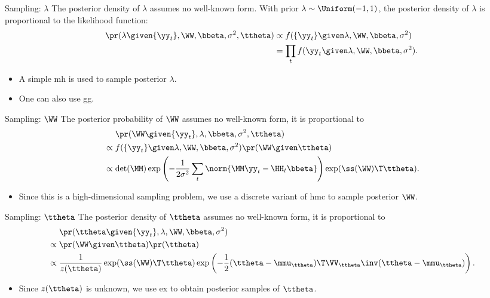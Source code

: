 \documentclass{beamer}
\begin{document}
\begin{frame}{Sampling: $\lambda$}
	The posterior density of $\lambda$ assumes no well-known form.
	With prior $\lambda\sim\Uniform(-1,1)$,
	the posterior density of $\lambda$ is proportional to the likelihood function:
	\begin{align*}
		\pr(\lambda\given\{\yy_{t}\},\WW,\bbeta,\sigma^2,\ttheta)
		&\propto f(\{\yy_{t}\}\given\lambda,\WW,\bbeta,\sigma^{2}) \\
		&= \prod_{t} f(\yy_{t}\given\lambda,\WW,\bbeta,\sigma^{2}).
	\end{align*}
	\begin{itemize}
		\item
			A simple \acrlong{mh} is used to sample posterior $\lambda$.
		\item
			One can also use \acrlong{gg}.
	\end{itemize}
\end{frame}

\begin{frame}{Sampling: $\WW$}
	The posterior probability of $\WW$ assumes no well-known form,
	it is proportional to
	\begin{align*}
		&\mathrel{\phantom{\propto}} \pr(\WW\given\{\yy_{t}\},\lambda,\bbeta,\sigma^{2},\ttheta) \\
		&\propto f(\{\yy_{t}\}\given\lambda,\WW,\bbeta,\sigma^{2}) \pr(\WW\given\ttheta) \\
		&\propto
		\det(\MM)
		\exp\left( -\frac1{2\sigma^2} \sum_{t} \norm{\MM\yy_{t}-\HH_{t}\bbeta} \right)
		\exp(\ss(\WW)\T\ttheta).
	\end{align*}
	\begin{itemize}
		\item
			Since this is a high-dimensional sampling problem,
			we use a discrete variant of \acrlong{hmc} to sample posterior $\WW$.
	\end{itemize}
\end{frame}

\begin{frame}{Sampling: $\ttheta$}
	The posterior density of $\ttheta$ assumes no well-known form,
	it is proportional to
	\begin{align*}
		&\mathrel{\phantom{\propto}} \pr(\ttheta\given\{\yy_{t}\},\lambda,\WW,\bbeta,\sigma^2) \\
		&\propto \pr(\WW\given\ttheta)\pr(\ttheta) \\
		&\propto
		\frac1{z(\ttheta)}
		\exp(\ss(\WW)\T\ttheta)
		\exp\left(-\frac12(\ttheta-\mmu_{\ttheta})\T\VV_{\ttheta}\inv(\ttheta-\mmu_{\ttheta})\right).
	\end{align*}
	\begin{itemize}
		\item
			Since $z(\ttheta)$ is unknown,
			we use \acrlong{ex} to obtain posterior samples of $\ttheta$.
	\end{itemize}
\end{frame}
\end{document}
